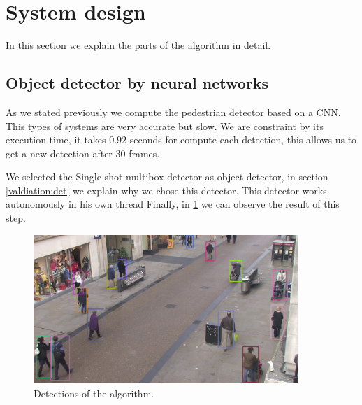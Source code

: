 \section{System design}

In this section we explain the parts of the algorithm in detail.

\subsection{Object detector by neural networks}



As we stated previously we compute the pedestrian detector based on a CNN. This types of systems are very accurate but slow. We are constraint by its execution time, it takes $0.92$ seconds for compute each detection, this allows us to get a new detection after $30$ frames. 


We selected the Single shot multibox detector as object detector, in section \ref{valdiation:det} we explain why we chose this detector. This detector works autonomously in his own thread Finally, in \ref{objectDetector1} we can observe the result of this step.


\begin{figure}[H]
\centering         
\includegraphics[width=10cm]{intro/deteccions.jpg}
\caption{Detections of the algorithm.} \label{objectDetector1}
\end{figure}



